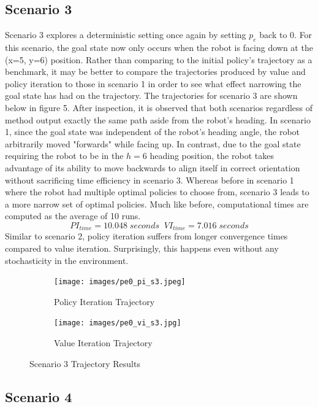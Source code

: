 \documentclass[fullpage]{article}
\begin{document}
\subsection{Scenario 3}

Scenario 3 explores a deterministic setting once again by setting $p_e$ back to 0. For this scenario, the goal state now only occurs when the robot is facing down at the (x=5, y=6) position. Rather than comparing to the initial policy's trajectory as a benchmark, it may be better to compare the trajectories produced by value and policy iteration to those in scenario 1 in order to see what effect narrowing the goal state has had on the trajectory. The trajectories for scenario 3 are shown below in figure 5. After inspection, it is observed that both scenarios regardless of method output exactly the same path aside from the robot's heading. In scenario 1, since the goal state was independent of the robot's heading angle, the robot arbitrarily moved "forwards" while facing up. In contrast, due to the goal state requiring the robot to be in the $h=6$ heading position, the robot takes advantage of its ability to move backwards to align itself in correct orientation without sacrificing time efficiency in scenario 3. Whereas before in scenario 1 where the robot had multiple optimal policies to choose from, scenario 3 leads to a more narrow set of optimal policies. Much like before, computational times are computed as the average of 10 runs.
\[
PI_{time} = 10.048 \; seconds \; \; VI_{time} = 7.016 \; seconds
\]
Similar to scenario 2, policy iteration suffers from longer convergence times compared to value iteration. Surprisingly, this happens even without any stochasticity in the environment. 

\begin{figure}[H]
\begin{subfigure}{.5\textwidth}
\centering
\texttt{[image: images/pe0\_pi\_s3.jpeg]}
\caption{Policy Iteration Trajectory}
\label{fig:a}
\end{subfigure}
\begin{subfigure}{.5\textwidth}
\centering
\texttt{[image: images/pe0\_vi\_s3.jpg]}
\caption{Value Iteration Trajectory}
\label{fig:b}
\end{subfigure}
\caption{Scenario 3 Trajectory Results}
\end{figure}

\subsection{Scenario 4}
\end{document}
